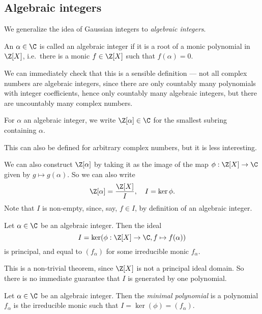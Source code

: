 \documentclass[a4paper]{article}
\begin{document}
\subsection{Algebraic integers}
We generalize the idea of Gaussian integers to \emph{algebraic integers}.

\begin{defi}
  An $\alpha \in \C$ is called an algebraic integer if it is a root of a monic polynomial in $\Z[X]$, i.e.\ there is a monic $f \in \Z[X]$ such that $f(\alpha) = 0$.
\end{defi}

We can immediately check that this is a sensible definition --- not all complex numbers are algebraic integers, since there are only countably many polynomials with integer coefficients, hence only countably many algebraic integers, but there are uncountably many complex numbers.

\begin{notation}
  For $\alpha$ an algebraic integer, we write $\Z[\alpha] \in \C$ for the smallest subring containing $\alpha$.
\end{notation}
This can also be defined for arbitrary complex numbers, but it is less interesting.

We can also construct $\Z[\alpha]$ by taking it as the image of the map $\phi: \Z[X] \to \C$ given by $g \mapsto g(\alpha)$. So we can also write
\[
  \Z[\alpha] = \frac{\Z[X]}{I},\quad I = \ker \phi.
\]
Note that $I$ is non-empty, since, say, $f \in I$, by definition of an algebraic integer.
\begin{prop}
  Let $\alpha \in \C$ be an algebraic integer. Then the ideal
  \[
    I = \ker(\phi: \Z[X] \to \C, f \mapsto f(\alpha))
  \]
  is principal, and equal to $(f_\alpha)$ for some irreducible monic $f_\alpha$.
\end{prop}
This is a non-trivial theorem, since $\Z[X]$ is not a principal ideal domain. So there is no immediate guarantee that $I$ is generated by one polynomial.

\begin{defi}
  Let $\alpha \in \C$ be an algebraic integer. Then the \emph{minimal polynomial} is a polynomial $f_\alpha$ is the irreducible monic such that $I = \ker(\phi) = (f_\alpha)$.
\end{defi}
\end{document}
